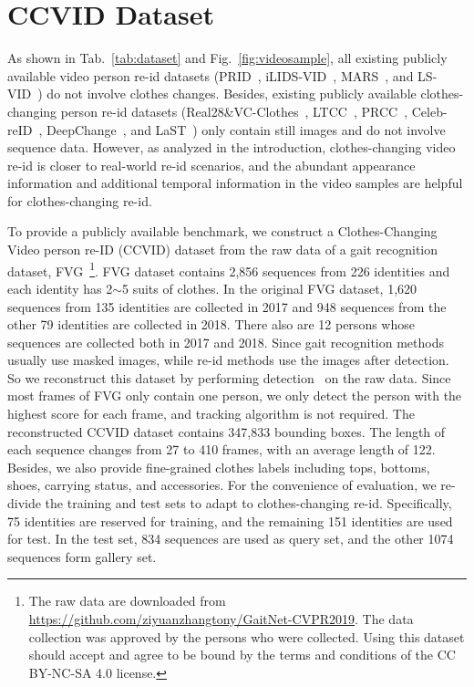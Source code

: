 \documentclass[10pt,twocolumn,letterpaper]{article}
\begin{document}
\section{CCVID Dataset}
As shown in Tab.~\ref{tab:dataset} and Fig.~\ref{fig:videosample}, all existing publicly available video person re-id datasets (\ie PRID~\cite{Hirzer2011PRID}, iLIDS-VID~\cite{Wang2014Person}, MARS~\cite{Zheng2016MARS}, and LS-VID~\cite{Li2019GLTR}) do not involve clothes changes.
Besides, existing publicly available clothes-changing person re-id datasets (\ie Real28\&VC-Clothes~\cite{Real28}, LTCC~\cite{Qian2020LTCC}, PRCC~\cite{Yang2019PRCC}, Celeb-reID~\cite{huang2019beyond}, DeepChange~\cite{DeepChange}, and LaST~\cite{LaST}) only contain still images and do not involve sequence data.
However, as analyzed in the introduction, clothes-changing video re-id is closer to real-world re-id scenarios, and the abundant appearance information and additional temporal information in the video samples are helpful for clothes-changing re-id.

To provide a publicly available benchmark, we construct a Clothes-Changing Video person re-ID (CCVID) dataset from the raw data of a gait recognition dataset, \ie FVG~\cite{Zhang2019Gait}\footnote{The raw data are downloaded from \url{https://github.com/ziyuanzhangtony/GaitNet-CVPR2019}. The data collection was approved by the persons who were collected. Using this dataset should accept and agree to be bound by the terms and conditions of the CC BY-NC-SA 4.0 license.}.
FVG dataset contains 2,856 sequences from 226 identities and each identity has 2$\sim$5 suits of clothes.
In the original FVG dataset, 1,620 sequences from 135 identities are collected in 2017 and 948 sequences from the other 79 identities are collected in 2018.
There also are 12 persons whose sequences are collected both in 2017 and 2018.
Since gait recognition methods usually use masked images, while re-id methods use the images after detection.
So we reconstruct this dataset by performing detection~\cite{He2017MaskRCNN} on the raw data.
Since most frames of FVG only contain one person, we only detect the person with the highest score for each frame, and tracking algorithm is not required.
The reconstructed CCVID dataset contains 347,833 bounding boxes.
The length of each sequence changes from 27 to 410 frames, with an average length of 122. 
Besides, we also provide fine-grained clothes labels including tops, bottoms, shoes, carrying status, and accessories.
For the convenience of evaluation, we re-divide the training and test sets to adapt to clothes-changing re-id.
Specifically, 75 identities are reserved for training, and the remaining 151 identities are used for test.
In the test set, 834 sequences are used as query set, and the other 1074 sequences form gallery set.
\end{document}
